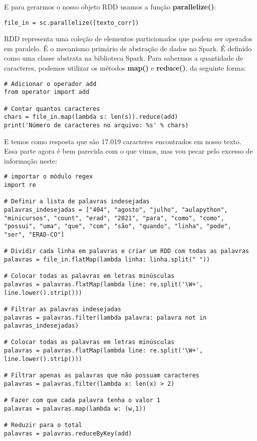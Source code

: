 E para gerarmos o nosso objeto RDD usamos a função \textbf{parallelize()}:
\begin{lstlisting}[]
file_in = sc.parallelize([texto_corr])
\end{lstlisting}

RDD representa uma coleção de elementos particionados que podem ser operados em paralelo. É o mecanismo primário ds abstração de dados no Spark. É definido como uma classe abstrata na biblioteca Spark. Para sabermos a quantidade de caracteres, podemos utilizar os métodos \textbf{map()} e \textbf{reduce()}, da seguinte forma:
\begin{lstlisting}[]
# Adicionar o operador add
from operator import add

# Contar quantos caracteres
chars = file_in.map(lambda s: len(s)).reduce(add)
print('Número de caracteres no arquivo: %s' % chars)
\end{lstlisting}

E temos como resposta que são 17.019 caracteres encontrados em nosso texto. Essa parte agora é bem parecida com o que vimos, mas vou pecar pelo excesso de informação neste:
\begin{lstlisting}[]
# importar o módulo regex
import re

# Definir a lista de palavras indesejadas
palavras_indesejadas = ["404", "agosto", "julho", "aulapython", "minicursos", "count", "erad", "2021", "para", "como", "como", "possui", "uma", "que", "com", "são", "quando", "linha", "pode", "ser", "ERAD-CO"]

# Dividir cada linha em palavras e criar um RDD com todas as palavras
palavras = file_in.flatMap(lambda linha: linha.split(" "))

# Colocar todas as palavras em letras minúsculas
palavras = palavras.flatMap(lambda line: re.split('\W+', line.lower().strip()))

# Filtrar as palavras indesejadas
palavras = palavras.filter(lambda palavra: palavra not in palavras_indesejadas)

# Colocar todas as palavras em letras minúsculas
palavras = palavras.flatMap(lambda line: re.split('\W+', line.lower().strip()))

# Filtrar apenas as palavras que não possuam caracteres
palavras = palavras.filter(lambda x: len(x) > 2)

# Fazer com que cada palavra tenha o valor 1
palavras = palavras.map(lambda w: (w,1))

# Reduzir para o total
palavras = palavras.reduceByKey(add)
\end{lstlisting}

